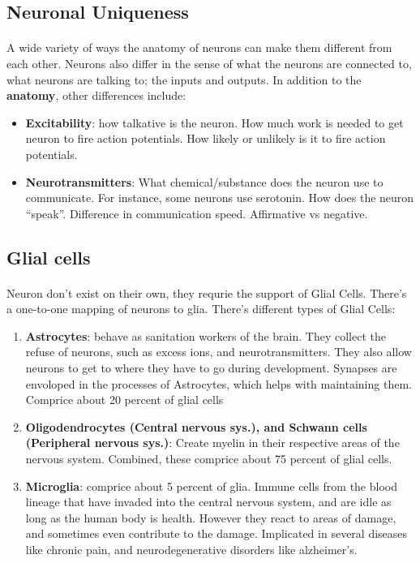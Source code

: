 \documentclass[12pt, a4paper]{article}
\begin{document}
\subsection{Neuronal Uniqueness}
\paragraph*{}
A wide variety of ways the anatomy of neurons can make them different from each other.
Neurons also differ in the sense of what the neurons are connected to, what neurons are talking to; the inputs
and outputs. In addition to the \textbf{anatomy}, other differences include:
\begin{itemize}
    \item \textbf{Excitability}: how talkative is the neuron. How much work is needed
    to get neuron to fire action potentials. How likely or unlikely is it to fire action potentials.
    \item \textbf{Neurotransmitters}: What chemical/substance does the neuron use to communicate.
    For instance, some neurons use serotonin. How does the neuron ``speak''. Difference in communication speed.
    Affirmative vs negative.
\end{itemize}

\subsection{Glial cells}
\paragraph*{}
Neuron don't exist on their own, they requrie the support of Glial Cells. There's a one-to-one
mapping of neurons to glia. There's different types of Glial Cells:
\begin{enumerate}
    \item \textbf{Astrocytes}: behave as sanitation workers of the brain. They collect the refuse of neurons, such as excess ions, and 
    neurotransmitters. They also allow neurons to get to where they have to go during development. Synapses are envoloped in the processes of 
    Astrocytes, which helps with maintaining them. Comprice about 20 percent of glial cells
    \item \textbf{Oligodendrocytes (Central nervous sys.), and Schwann cells (Peripheral nervous sys.)}: Create
    myelin in their respective areas of the nervous system. Combined, these comprice about 75 percent of glial cells.
    \item \textbf{Microglia}: comprice about 5 percent of glia. Immune cells from the blood lineage that have invaded into the central nervous system,
    and are idle as long as the human body is health. However they react to areas of damage, and sometimes even contribute to the damage. Implicated in several diseases like
    chronic pain, and neurodegenerative disorders like alzheimer's.
\end{enumerate}
\end{document}
